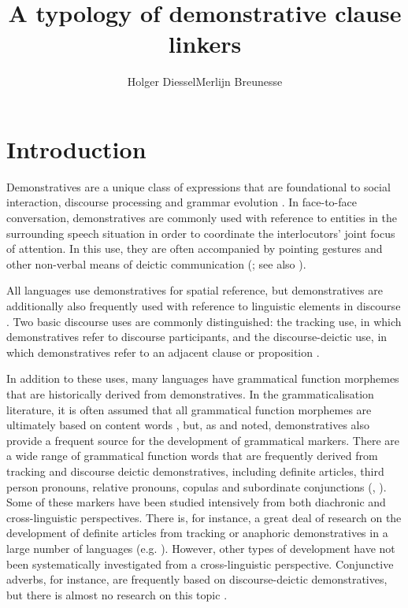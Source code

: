 \documentclass[output=paper,colorlinks,citecolor=brown]{langscibook}
\author{Holger Diessel\affiliation{Friedrich Schiller University Jena}\orcid{}\lastand Merlijn Breunesse\affiliation{University of Amsterdam}\orcid{}}
\title{A typology of demonstrative clause linkers}
\begin{document}
\maketitle 


\section{Introduction}\label{sec:diessel:1}

Demonstratives are a unique class of expressions that are foundational to social interaction, discourse processing and grammar evolution \citep{Diessel2006,Diessel2013,Diessel2014}. In face-to-face conversation, demonstratives are commonly used with reference to entities in the surrounding speech situation in order to coordinate the interlocutors’ joint focus of attention. In this use, they are often accompanied by pointing gestures and other non-verbal means of deictic communication (\citealt{Bühler1934}; see also \citealt{CoventryEtAl2008}).

All languages use demonstratives for spatial reference, but demonstratives are additionally also frequently used with reference to linguistic elements in discourse \citep{HallidayHasan1976}. Two basic discourse uses are commonly distinguished: the tracking use, in which demonstratives refer to discourse participants, and the discourse-deictic use, in which demonstratives refer to an adjacent clause or proposition \citep{Webber1991}.

In addition to these uses, many languages have grammatical function morphemes that are historically derived from demonstratives. In the grammaticalisation literature, it is often assumed that all grammatical function morphemes are ultimately based on content words \citep[111]{HeineKuteva2007}, but, as \citet{Brugmann1904} and \citet{Bühler1934} noted, demonstratives also provide a frequent source for the development of grammatical markers. There are a wide range of grammatical function words that are frequently derived from tracking and discourse deictic demonstratives, including definite articles, third person pronouns, relative pronouns, copulas and subordinate conjunctions (\citealt{Himmelmann1997,Diessel1999Book}, \citeyear{Diessel1999Article}). Some of these markers have been studied intensively from both diachronic and cross-linguistic perspectives. There is, for instance, a great deal of research on the development of definite articles from tracking or anaphoric demonstratives in a large number of languages (e.g. \citealt{Harris1978,Cyr1993,Laury1997}). However, other types of development have not been systematically investigated from a cross-linguistic perspective. Conjunctive adverbs, for instance, are frequently based on discourse-deictic demonstratives, but there is almost no research on this topic \citep[125-127]{Diessel1999Book}.
\end{document}

